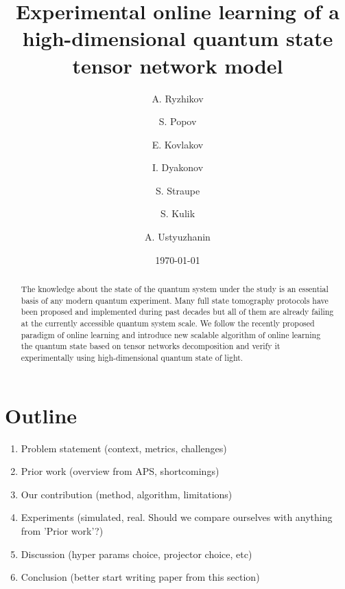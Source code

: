 \documentclass[%
 reprint,
 amsmath,amssymb,
 aps,
]{revtex4-2}
\begin{document}

\title{Experimental online learning of a high-dimensional quantum state tensor network model}%

\author{A. Ryzhikov}
\author{S. Popov}%
%

\author{E. Kovlakov}
\author{I. Dyakonov}
\author{S. Straupe}
\author{S. Kulik}
%

\author{A. Ustyuzhanin}
%

\date{\today}%

\begin{abstract}
The knowledge about the state of the quantum system under the study is an essential basis of any modern quantum experiment. Many full state tomography protocols have been proposed and implemented during past decades but all of them are already failing at the currently accessible quantum system scale. We follow the recently proposed paradigm of online learning and introduce new scalable algorithm of online learning the quantum state based on tensor networks decomposition and verify it experimentally using high-dimensional quantum state of light.
\end{abstract}

\maketitle

\section{Outline}
\begin{enumerate}
    \item Problem statement (context, metrics, challenges)
    \item Prior work (overview from APS, shortcomings)
    \item Our contribution (method, algorithm, limitations)
    \item Experiments (simulated, real. Should we compare ourselves with anything from 'Prior work'?)
    \item Discussion (hyper params choice, projector choice, etc)
    \item Conclusion (better start writing paper from this section)
\end{enumerate}
\end{document}
